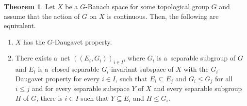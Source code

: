 \documentclass[a4paper,12pt]{amsart}
\theoremstyle{definition}
\newtheorem{theorem}{Theorem}[section]
\theoremstyle{definition}
\theoremstyle{remark}
\numberwithin{equation}{section}
\renewcommand{\leq}{\leqslant}
\newcommand{\<}{\langle}
\renewcommand{\>}{\rangle}
\begin{document}
	\begin{theorem}
		Let $X$ be a $G$-Banach space for some topological group $G$ and assume that the action of $G$ on $X$ is continuous. Then, the following are equivalent.
		\begin{enumerate}
			\item $X$ has the $G$-Daugavet property.
			\item There exists a~net $((E_i, G_i))_{i \in I}$, where $G_i$ is a~separable subgroup of $G$ and $E_i$ is a~closed separable $G_i$-invariant subspace of $X$ with the $G_i$-Daugavet property for every $i \in I$, such that $E_i \subseteq E_j$ and $G_i \leq G_j$ for all $i \leq j$ and for every separable subspace $Y$ of $X$ and every separable subgroup $H$ of $G$, there is $i \in I$ such that $Y \subseteq E_i$ and $H \leq G_i$.
		\end{enumerate}
	\end{theorem}
\end{document}
